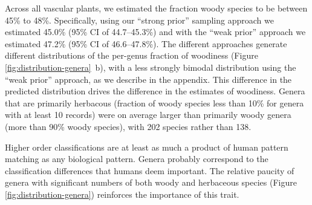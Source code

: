 \documentclass[12pt]{article}
\begin{document}



Across all vascular plants, we estimated the fraction woody species to
be between 45\% to 48\%.
Specifically, using our ``strong prior'' sampling approach we
estimated 45.0\% (95\% CI of 44.7--45.3\%) and with the ``weak prior''
approach we estimated 47.2\% (95\% CI of 46.6--47.8\%).  
% 
The different approaches generate different distributions of the
per-genus fraction of woodiness (Figure
\ref{fig:distribution-genera}~b), with a less strongly bimodal
distribution using the ``weak prior'' approach, as we describe in the
appendix.
%
This difference in the predicted distribution drives the difference in
the estimates of woodiness.  Genera that are primarily herbacous
(fraction of woody species less than 10\% for genera with at least 10
records) were on average larger than primarily woody genera (more than
90\% woody species), with 202 species rather than 138.
%

Higher order classifications are at least as much a product of human
pattern matching as any biological pattern.  Genera probably
correspond to the classification differences that humans deem
important.  The relative paucity of genera with significant numbers of
both woody and herbaceous species (Figure
\ref{fig:distribution-genera}) reinforces the importance of this
trait.
\end{document}
